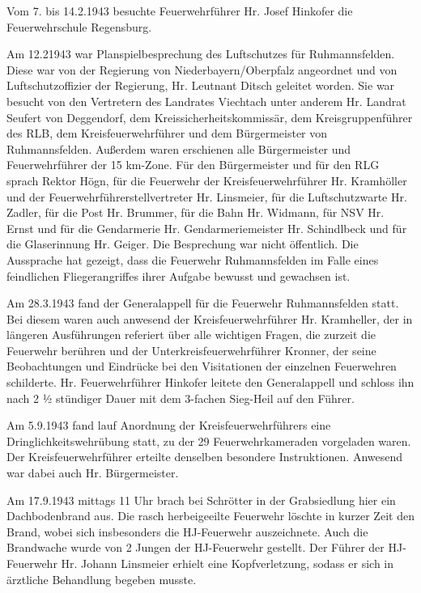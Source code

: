 \documentclass[12pt,a4paper]{book}
\begin{document}
Vom 7. bis 14.2.1943 besuchte Feuerwehrführer Hr. Josef Hinkofer die
Feuerwehrschule Regensburg.

Am 12.21943 war Planspielbesprechung des Luftschutzes für Ruhmannsfelden. Diese
war von der Regierung von Niederbayern/Oberpfalz angeordnet und von
Luftschutzoffizier der Regierung, Hr. Leutnant Ditsch geleitet worden. Sie war
besucht von den Vertretern des Landrates Viechtach unter anderem Hr. Landrat
Seufert von Deggendorf, dem Kreissicherheitskommissär, dem Kreisgruppenführer
des RLB, dem Kreisfeuerwehrführer und dem Bürgermeister von Ruhmannsfelden.
Außerdem waren erschienen alle Bürgermeister und Feuerwehrführer der 15 km-Zone.
Für den Bürgermeister und für den RLG sprach Rektor Högn, für die Feuerwehr der
Kreisfeuerwehrführer Hr. Kramhöller und der Feuerwehrführerstellvertreter Hr.
Linsmeier, für die Luftschutzwarte Hr. Zadler, für die Post Hr. Brummer, für die
Bahn Hr. Widmann, für NSV Hr. Ernst und für die Gendarmerie Hr.
Gendarmeriemeister Hr. Schindlbeck und für die Glaserinnung Hr. Geiger. Die
Besprechung war nicht öffentlich. Die Aussprache hat gezeigt, dass die Feuerwehr
Ruhmannsfelden im Falle eines feindlichen Fliegerangriffes ihrer Aufgabe bewusst
und gewachsen ist.

Am 28.3.1943 fand der Generalappell für die Feuerwehr Ruhmannsfelden statt. Bei
diesem waren auch anwesend der Kreisfeuerwehrführer Hr. Kramheller, der in
längeren Ausführungen referiert über alle wichtigen Fragen, die zurzeit die
Feuerwehr berühren und der Unterkreisfeuerwehrführer Kronner, der seine
Beobachtungen und Eindrücke bei den Visitationen der einzelnen Feuerwehren
schilderte. Hr. Feuerwehrführer Hinkofer leitete den Generalappell und schloss
ihn nach 2 ½ stündiger Dauer mit dem 3-fachen Sieg-Heil auf den Führer.

Am 5.9.1943 fand lauf Anordnung der Kreisfeuerwehrführers eine
Dringlichkeitswehrübung statt, zu der 29 Feuerwehrkameraden vorgeladen waren.
Der Kreisfeuerwehrführer erteilte denselben besondere Instruktionen. Anwesend
war dabei auch Hr. Bürgermeister.

Am 17.9.1943 mittags 11 Uhr brach bei Schrötter in der Grabsiedlung hier ein
Dachbodenbrand aus. Die rasch herbeigeeilte Feuerwehr löschte in kurzer Zeit den
Brand, wobei sich insbesonders die HJ-Feuerwehr auszeichnete. Auch die
Brandwache wurde von 2 Jungen der HJ-Feuerwehr gestellt. Der Führer der
HJ-Feuerwehr Hr. Johann Linsmeier erhielt eine Kopfverletzung, sodass er sich in
ärztliche Behandlung begeben musste.
\end{document}
